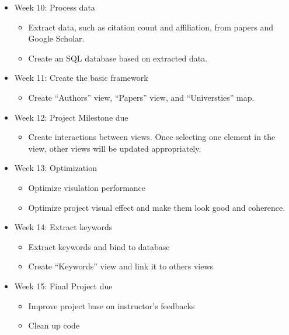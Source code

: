 \begin{itemize}
	\item Week 10: Process data
	\begin{itemize}
		\item Extract data, such as citation count and affiliation, from papers and Google Scholar.
		\item Create an SQL database based on extracted data.
	\end{itemize}
	\item Week 11: Create the basic framework
	\begin{itemize}
		\item Create ``Authors'' view, ``Papers'' view, and ``Universties'' map.
	\end{itemize}
	\item Week 12: Project Milestone due
	\begin{itemize}
		\item Create interactions between views. Once selecting one element in the view, other views will be updated appropriately.
	\end{itemize}
	\item Week 13: Optimization
	\begin{itemize}
		\item Optimize visulation performance 
		\item Optimize project visual effect and make them look good and coherence.
	\end{itemize}
	\item Week 14: Extract keywords 
	\begin{itemize}
		\item Extract keywords and bind to database
		\item Create ``Keywords'' view and link it to others views
	\end{itemize}
	\item Week 15: Final Project due
	\begin{itemize} 
		\item Improve project base on instructor's feedbacks 
		\item Clean up code 
	\end{itemize} 
\end{itemize}